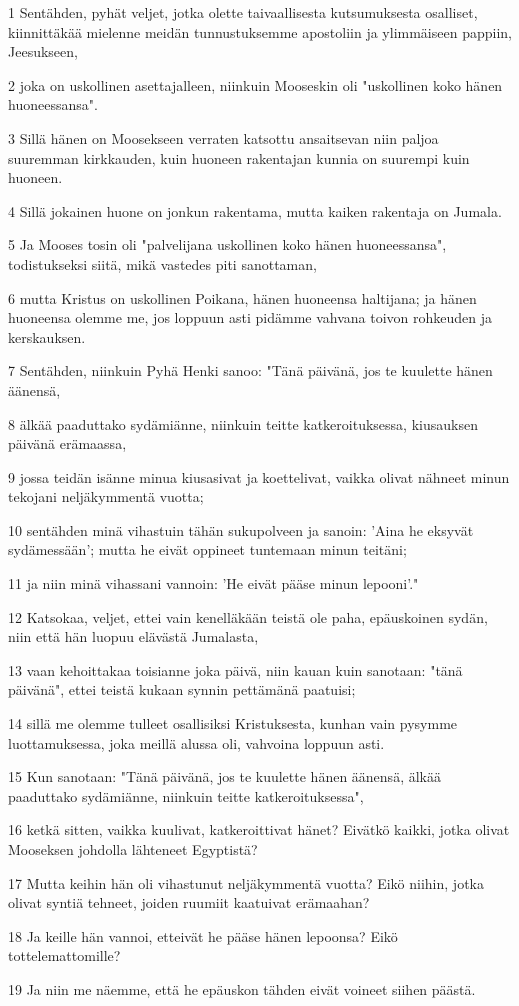 \par 1 Sentähden, pyhät veljet, jotka olette taivaallisesta kutsumuksesta osalliset, kiinnittäkää mielenne meidän tunnustuksemme apostoliin ja ylimmäiseen pappiin, Jeesukseen,
\par 2 joka on uskollinen asettajalleen, niinkuin Mooseskin oli "uskollinen koko hänen huoneessansa".
\par 3 Sillä hänen on Moosekseen verraten katsottu ansaitsevan niin paljoa suuremman kirkkauden, kuin huoneen rakentajan kunnia on suurempi kuin huoneen.
\par 4 Sillä jokainen huone on jonkun rakentama, mutta kaiken rakentaja on Jumala.
\par 5 Ja Mooses tosin oli "palvelijana uskollinen koko hänen huoneessansa", todistukseksi siitä, mikä vastedes piti sanottaman,
\par 6 mutta Kristus on uskollinen Poikana, hänen huoneensa haltijana; ja hänen huoneensa olemme me, jos loppuun asti pidämme vahvana toivon rohkeuden ja kerskauksen.
\par 7 Sentähden, niinkuin Pyhä Henki sanoo: "Tänä päivänä, jos te kuulette hänen äänensä,
\par 8 älkää paaduttako sydämiänne, niinkuin teitte katkeroituksessa, kiusauksen päivänä erämaassa,
\par 9 jossa teidän isänne minua kiusasivat ja koettelivat, vaikka olivat nähneet minun tekojani neljäkymmentä vuotta;
\par 10 sentähden minä vihastuin tähän sukupolveen ja sanoin: 'Aina he eksyvät sydämessään'; mutta he eivät oppineet tuntemaan minun teitäni;
\par 11 ja niin minä vihassani vannoin: 'He eivät pääse minun lepooni'."
\par 12 Katsokaa, veljet, ettei vain kenelläkään teistä ole paha, epäuskoinen sydän, niin että hän luopuu elävästä Jumalasta,
\par 13 vaan kehoittakaa toisianne joka päivä, niin kauan kuin sanotaan: "tänä päivänä", ettei teistä kukaan synnin pettämänä paatuisi;
\par 14 sillä me olemme tulleet osallisiksi Kristuksesta, kunhan vain pysymme luottamuksessa, joka meillä alussa oli, vahvoina loppuun asti.
\par 15 Kun sanotaan: "Tänä päivänä, jos te kuulette hänen äänensä, älkää paaduttako sydämiänne, niinkuin teitte katkeroituksessa",
\par 16 ketkä sitten, vaikka kuulivat, katkeroittivat hänet? Eivätkö kaikki, jotka olivat Mooseksen johdolla lähteneet Egyptistä?
\par 17 Mutta keihin hän oli vihastunut neljäkymmentä vuotta? Eikö niihin, jotka olivat syntiä tehneet, joiden ruumiit kaatuivat erämaahan?
\par 18 Ja keille hän vannoi, etteivät he pääse hänen lepoonsa? Eikö tottelemattomille?
\par 19 Ja niin me näemme, että he epäuskon tähden eivät voineet siihen päästä.

